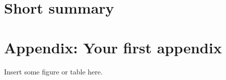 \documentclass[12pt,a4paper,faculty=ea,language=en,doctype=article]{ugent-doc}
\renewcommand{\ULthickness}{2pt} %
\begin{document}

\maketitle
\renewcommand{\ULthickness}{1pt}


{\hypersetup{hidelinks}\tableofcontents} %
\newpage


\section*{Short summary}



\appendix
\section{Appendix: Your first appendix}
Insert some figure or table here.
\end{document}
